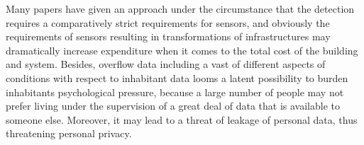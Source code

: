 Many papers have given an approach under the circumstance that the
detection requires a comparatively strict requirements for sensors,
and obviously the requirements of sensors resulting in transformations
of infrastructures may dramatically increase expenditure when it comes
to the total cost of the building and system. Besides, overflow data
including a vast of different aspects of conditions with respect to
inhabitant data looms a latent possibility to burden inhabitants
psychological pressure, because a large number of people may not
prefer living under the supervision of a great deal of data that is
available to someone else. Moreover, it may lead to a threat of
leakage of personal data, thus threatening personal privacy.



